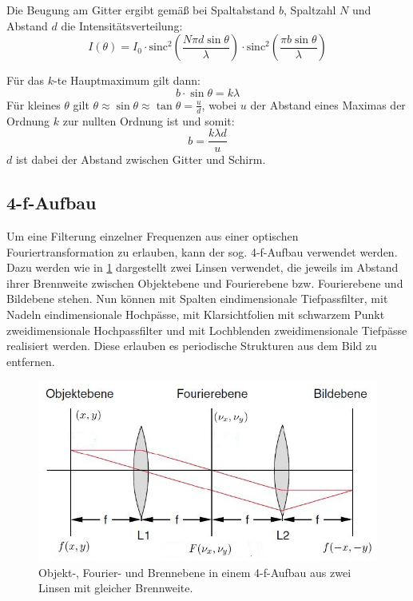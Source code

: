 \documentclass[
	a4paper,
	12pt,
	pagesize,
	ngerman
]{scrartcl}
\begin{document}
	Die Beugung am Gitter ergibt gemäß \cite{Anleitung} bei Spaltabstand $b$, Spaltzahl $N$ und Abstand $d$ die Intensitätsverteilung:
	\begin{equation}
		I(\theta) = I_0 \cdot \text{sinc}^2\left(\frac{N \pi d \sin \theta}{\lambda} \right) \cdot \text{sinc}^2\left(\frac{\pi b \sin \theta}{\lambda} \right)
	\end{equation}


	Für das $k$-te Hauptmaximum gilt dann:
	\begin{equation}
		b \cdot \sin{\theta} = k \lambda
	\end{equation}
	Für kleines $\theta$ gilt $\theta \approx \sin{\theta} \approx \tan{\theta}=\frac{u}{d}$, wobei $u$ der Abstand eines Maximas der Ordnung $k$ zur nullten Ordnung ist und somit:
	\begin{equation}
		\label{eq_beug}
		b = \frac{k\lambda d}{u}
	\end{equation}
	$d$ ist dabei der Abstand zwischen Gitter und Schirm.
	\cite{Anleitung}

	\subsection{4-f-Aufbau}
	Um eine Filterung einzelner Frequenzen aus einer optischen Fouriertransformation zu erlauben, kann der sog. 4-f-Aufbau verwendet werden.
	Dazu werden wie in \cref{fig_4f_schema} dargestellt zwei Linsen verwendet, die jeweils im Abstand ihrer Brennweite zwischen Objektebene und Fourierebene bzw. Fourierebene und Bildebene stehen.
	Nun können mit Spalten eindimensionale Tiefpassfilter, mit Nadeln eindimensionale Hochpässe, mit Klarsichtfolien mit schwarzem Punkt zweidimensionale Hochpassfilter und mit Lochblenden zweidimensionale Tiefpässe realisiert werden.
	Diese erlauben es periodische Strukturen aus dem Bild zu entfernen.
	\cite{Anleitung}

	\begin{figure}[H]
			\includegraphics[width=1\linewidth]{img/4f_schema}
			\caption{
				Objekt-, Fourier- und Brennebene in einem 4-f-Aufbau aus zwei Linsen mit gleicher Brennweite. \cite{Anleitung}
			}
			\label{fig_4f_schema}
	\end{figure}
\end{document}
